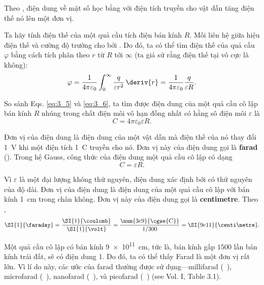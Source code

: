 \noindent
Theo , điện dung về mặt số học bằng với điện tích truyền cho vật dẫn tăng điện thế nó lên một đơn vị.

Ta hãy tính điện thế của một quả cầu tích điện bán kính $R$. Mối liên hệ giữa hiệu điện thế và cường độ trường cho bởi . Do đó, ta có thể tìm điện thế của quả cầu $\varphi$ bằng cách tích phân  theo $r$ từ $R$ tới $\infty$ (ta giả sử rằng điện thế tại vô cực là không):
\begin{equation}\label{eq:3_6}
    \varphi = \frac{1}{4\pi\varepsilon_0} \int_0^{\infty} \frac{q}{\varepsilon r^2}\, \deriv{r} = \frac{1}{4\pi\varepsilon_0} \frac{q}{\varepsilon R}.
\end{equation}

\noindent
So sánh Eqs. \eqref{eq:3_5} và \eqref{eq:3_6}, ta tìm được điện dung của một quả cầu cô lập bán kính $R$ nhúng trong chất điện môi vô hạn đồng nhất có hằng sô điện môi $\varepsilon$ là
\begin{equation}\label{eq:3_7}
    C = 4\pi\varepsilon_0 \varepsilon R.
\end{equation}

Đơn vị của điện dung là điện dung của một vật dẫn mà điện thế của nó thay đổi \SI{1}{\volt} khi một điện tích \SI{1}{\coulomb} truyền cho nó. Đơn vị này của điện dung gọi là \textbf{farad} (\si{\faraday}).
Trong hệ Gauss, công thức của điện dung một quả cầu cô lập có dạng
\begin{equation}\label{eq:3_8}
    C = \varepsilon R.
\end{equation}

\noindent
Vì $\varepsilon$ là một đại lượng không thứ nguyên, điện dung xác định bởi  có thứ nguyên của độ dài. Đơn vị của điện dung là điện dung của một quả cầu cô lập với bán kính \SI{1}{\centi\metre} trong chân không. Đơn vị này của điện dung gọi là \textbf{centimetre}. Theo ,
\begin{equation}\label{eq:3_9}
    \SI{1}{\faraday} = \frac{\SI{1}{\coulomb}}{\SI{1}{\volt}} = \frac{\num{3e9}{\cgse{C}}}{1/300} = \SI{9e11}{\centi\metre}.
\end{equation}

Một quả cầu cô lập có bán kính \SI{9e11}{\centi\metre}, tức là, bán kính gấp $1500$ lần bán kính trái đất, sẽ có điện dung \SI{1}{\faraday}. Do đó, ta có thể thấy Farad là một đơn vị rất lớn. Vì lí do này, các ước của farad thường được sử dụng---millifarad (\si{\milli\faraday}), microfarad (\si{\micro\faraday}), nanofarad (\si{\nano\faraday}), và picofarad (\si{\pico\faraday}) (see Vol. I, Table 3.1).

